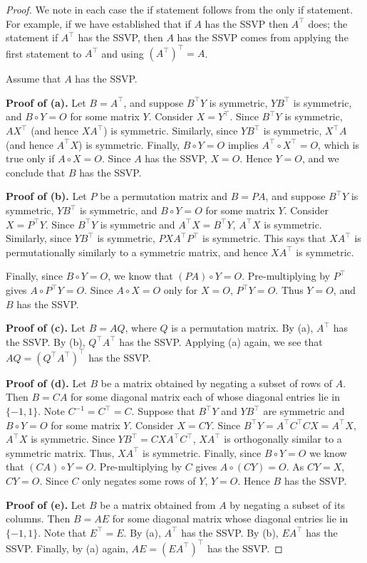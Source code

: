 \documentclass[preprint,12pt]{elsarticle}
\newcommand{\trans  }{^\top}
\begin{document}
\begin{proof}
We note in each case the if statement follows from the only if statement. For example, 
if we have established that if $A$ has the SSVP then $A\trans $ does; the statement
if $A\trans $ has the SSVP, then $A$ has the SSVP comes from applying the first statement 
to $A\trans $ and using $(A\trans )\trans =A$.  

Assume that $A$ has the SSVP. 

\bigskip\noindent
{\bf Proof of (a).} Let $B=A\trans $, and  suppose $B\trans  Y$ is symmetric, $YB\trans $ is symmetric, and $B\circ Y = O$ for some matrix $Y$. Consider $X = Y\trans $. Since $B\trans  Y$ is symmetric,  $AX\trans$ (and hence $X A\trans $) is symmetric.
Similarly, since $Y B\trans $ is symmetric, $X\trans A$
(and hence $A\trans X$) is symmetric. Finally, $B\circ Y = O$ implies  $A\trans  \circ X\trans  = O$, which is true only if $A   \circ X = O$.  Since $A$ has the SSVP, $X=O$. Hence $Y=O$, and 
we conclude that $B$ has the SSVP. 

\bigskip\noindent
{\bf Proof of (b).} Let $P$ be a permutation matrix and $B=PA$, and suppose $B\trans  Y$ is symmetric, $YB\trans $ is symmetric, and $B \circ Y = O$ for some matrix $Y$. Consider $X = P\trans  Y$. Since $B\trans  Y$ is symmetric 
and $A\trans X = B\trans Y$, $A\trans X$ is symmetric. Similarly, since $YB\trans $ is symmetric, $PXA\trans P\trans$ is symmetric.  This says that  $XA\trans$ is permutationally similarly to a symmetric matrix, and hence
$XA\trans$ is symmetric. 


Finally, since $B\circ Y = O$, we know that $(PA)\circ Y = O$. Pre-multiplying by $P\trans $ gives $A\circ P\trans  Y = O$. Since $A\circ X = O$ only for $X = O$, $P\trans  Y  = O$. Thus $Y = O$, and $B$ has the SSVP.

\bigskip\noindent
{\bf Proof of
(c).} Let $B=AQ$, where $Q$ is a permutation matrix. By (a), $A\trans $ has the SSVP.
By (b), $Q\trans  A\trans $ has the SSVP. Applying (a) again, we see that 
$AQ=(Q\trans  A\trans )\trans $ has the SSVP. 


\bigskip\noindent
{\bf Proof of
(d).} Let $B$ be a matrix obtained by negating a subset of rows of $A$. Then   
$B = CA$ for some diagonal matrix each of whose diagonal entries lie in $\{-1,1\}$. 
Note $C^{-1} = C\trans =C$.  Suppose that $B\trans  Y$ and $YB\trans $ are symmetric and  $B \circ Y = O$ 
for some matrix $Y$. Consider $X = CY$. 
Since $B\trans Y=A\trans C\trans C X=A\trans X$, 
$A\trans X$ is symmetric. 
Since $Y B\trans=CXA\trans C \trans$, 
$XA \trans$ is orthogonally similar to a symmetric matrix.  Thus, $XA\trans$ is symmetric.
Finally, since $B \circ Y = O$ we know that $(CA) \circ Y = O$. Pre-multiplying by $C$ gives $A \circ (CY) = O$. As $CY = X$, $CY=O$. Since $C$ only negates some rows of $Y$, $Y=O$. Hence $B$ has the SSVP.

\bigskip\noindent
{\bf Proof of
(e).}  Let $B$ be a matrix obtained from $A$ by negating a subset of its columns. 
Then $B=AE$ for some diagonal matrix whose diagonal entries lie in $\{-1,1\}$.
 Note that $E\trans =E$.
By (a), $A\trans $ has the SSVP.  By (b), $EA\trans $ has the SSVP.
Finally, by (a) again, $AE=(EA\trans )\trans $ has the SSVP. 
\end{proof}
\end{document}
